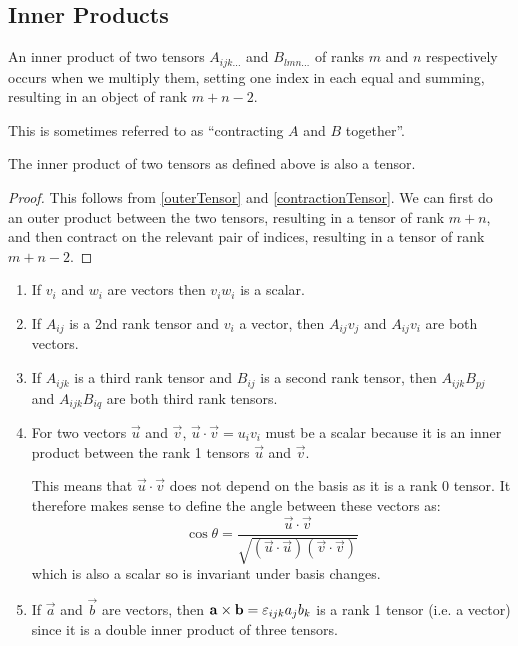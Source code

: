 \documentclass[../main.tex]{subfiles}
\begin{document}
\subsection{Inner Products}
\label{innerProduct}
\begin{definition}
  An inner product of two tensors $A_{ijk\ldots}$ and $B_{lmn\ldots}$ of ranks $m$ and $n$ respectively occurs when we multiply them, setting one index in each equal and summing, resulting in an object of rank $m + n - 2$.
\end{definition}
\begin{remark}[Nomenclature]
  This is sometimes referred to as ``contracting $A$ and $B$ together''.
\end{remark}
\begin{lemma}
  The inner product of two tensors as defined above is also a tensor.
\end{lemma}
\begin{proof}
  This follows from \cref{outerTensor} and \cref{contractionTensor}.
  We can first do an outer product between the two tensors, resulting in a tensor of rank $m + n$, and then contract on the relevant pair of indices, resulting in a tensor of rank $m + n - 2$.
\end{proof}
\begin{example}
  \begin{enumerate}
    \item If $v_i$ and $w_i$ are vectors then $v_iw_i$ is a scalar.
    \item If $A_{i j}$ is a 2nd rank tensor and $v_i$ a vector, then $A_{i j}v_j$ and $A_{i j}v_i$ are both vectors.
    \item If $A_{ijk}$ is a third rank tensor and $B_{i j}$ is a second rank tensor, then $A_{i j k}B_{p j}$ and $A_{i j k}B_{i q}$ are both third rank tensors.
    \item For two vectors $\vec{u}$ and $\vec{v}$, $\vec{u} \cdot \vec{v} = u_iv_i$ must be a scalar because it is an inner product between the rank 1 tensors $\vec{u}$ and $\vec{v}$.

      This means that $\vec{u} \cdot \vec{v}$ does not depend on the basis as it is a rank 0 tensor.
      It therefore makes sense to define the angle between these vectors as:
      \[
        \cos \theta = \frac{\vec{u} \cdot \vec{v}}{\sqrt{(\vec{u} \cdot \vec{u})(\vec{v} \cdot \vec{v})}}
      \]
      which is also a scalar so is invariant under basis changes.
    \item If $\vec{a}$ and $\vec{b}$ are vectors, then $\mathbf{\bm{a}} \times \mathbf{\bm{b}} = \varepsilon_{i j k}a_jb_k$ is a rank 1 tensor (i.e. a vector) since it is a double inner product of three tensors.
  \end{enumerate}
\end{example}
\end{document}
